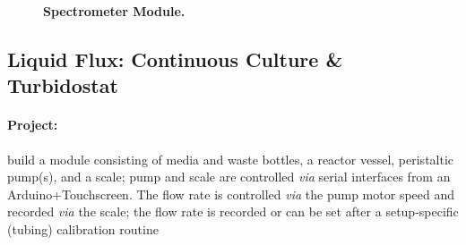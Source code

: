 \documentclass[12pt,a4paper]{scrartcl}
\begin{document}
\begin{figure}[ht]
  \begin{minipage}{.49\textwidth}
  \end{minipage}
  \begin{minipage}{.49\textwidth}
  \end{minipage}
\caption[]{\textbf{Spectrometer Module.}}
\end{figure}

\newpage
\subsection{Liquid Flux: Continuous Culture \& Turbidostat} 
\label{cult}

\paragraph{Project:} build a module consisting of media and waste bottles, 
a reactor vessel, peristaltic pump(s), and a scale; pump and scale are
controlled \textit{via} serial interfaces from an
Arduino+Touchscreen. The flow rate is controlled \textit{via} the pump
motor speed and recorded \textit{via} the scale; the flow rate is
recorded or can be set after a setup-specific (tubing) calibration
routine
\end{document}
